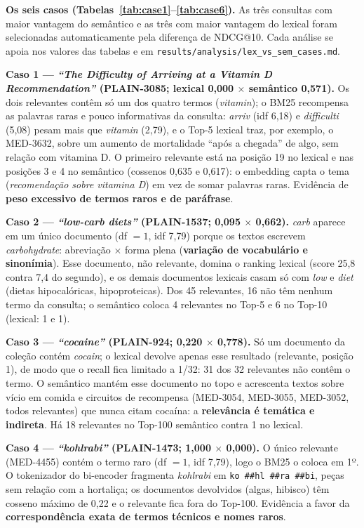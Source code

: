 \textbf{Os seis casos (Tabelas~\ref{tab:case1}--\ref{tab:case6}).} As três consultas com maior vantagem do semântico e as três com maior vantagem do lexical foram selecionadas automaticamente pela diferença de NDCG@10. Cada análise se apoia nos valores das tabelas e em \texttt{results/\allowbreak analysis/\allowbreak lex\_vs\_sem\_cases.md}.



\textbf{Caso 1 --- \emph{``The Difficulty of Arriving at a Vitamin D Recommendation''} (PLAIN-3085; lexical 0,000 $\times$ semântico 0,571).} Os dois relevantes contêm só um dos quatro termos (\emph{vitamin}); o BM25 recompensa as palavras raras e pouco informativas da consulta: \emph{arriv} (idf 6,18) e \emph{difficulti} (5,08) pesam mais que \emph{vitamin} (2,79), e o Top-5 lexical traz, por exemplo, o MED-3632, sobre um aumento de mortalidade ``após a chegada'' de algo, sem relação com vitamina D. O primeiro relevante está na posição 19 no lexical e nas posições 3 e 4 no semântico (cossenos 0,635 e 0,617): o embedding capta o tema (\emph{recomendação sobre vitamina D}) em vez de somar palavras raras. Evidência de \textbf{peso excessivo de termos raros e de paráfrase}.

\textbf{Caso 2 --- \emph{``low-carb diets''} (PLAIN-1537; 0,095 $\times$ 0,662).} \emph{carb} aparece em um único documento (df $=1$, idf 7,79) porque os textos escrevem \emph{carbohydrate}: abreviação $\times$ forma plena (\textbf{variação de vocabulário e sinonímia}). Esse documento, não relevante, domina o ranking lexical (score 25,8 contra 7,4 do segundo), e os demais documentos lexicais casam só com \emph{low} e \emph{diet} (dietas hipocalóricas, hipoproteicas). Dos 45 relevantes, 16 não têm nenhum termo da consulta; o semântico coloca 4 relevantes no Top-5 e 6 no Top-10 (lexical: 1 e 1).

\textbf{Caso 3 --- \emph{``cocaine''} (PLAIN-924; 0,220 $\times$ 0,778).} Só um documento da coleção contém \emph{cocain}; o lexical devolve apenas esse resultado (relevante, posição 1), de modo que o recall fica limitado a 1/32: 31 dos 32 relevantes não contêm o termo. O semântico mantém esse documento no topo e acrescenta textos sobre vício em comida e circuitos de recompensa (MED-3054, MED-3055, MED-3052, todos relevantes) que nunca citam cocaína: a \textbf{relevância é temática e indireta}. Há 18 relevantes no Top-100 semântico contra 1 no lexical.

\textbf{Caso 4 --- \emph{``kohlrabi''} (PLAIN-1473; 1,000 $\times$ 0,000).} O único relevante (MED-4455) contém o termo raro (df $=1$, idf 7,79), logo o BM25 o coloca em 1º. O tokenizador do bi-encoder fragmenta \emph{kohlrabi} em \texttt{ko\,\#\#hl\,\#\#ra\,\#\#bi}, peças sem relação com a hortaliça; os documentos devolvidos (algas, hibisco) têm cosseno máximo de 0,22 e o relevante fica fora do Top-100. Evidência a favor da \textbf{correspondência exata de termos técnicos e nomes raros}.

